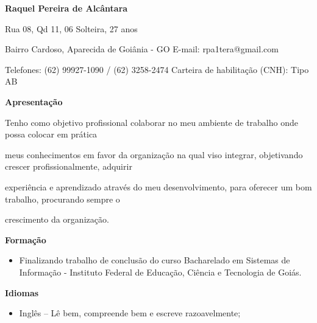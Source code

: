 \documentclass[a4paper,10pt]{report}
\newcommand{\nome}{Raquel Pereira de Alcântara}
\begin{document}
\pagestyle{empty}

\begin{center}
\begin{LARGE} 
 \textbf{\nome}
\end{LARGE}

\vspace{4em}
\begin{footnotesize}
Rua 08, Qd 11, 06 \hfill Solteira, 27 anos%

Bairro Cardoso, Aparecida de Goiânia - GO \hfill E-mail: rpa1tera@gmail.com%


Telefones: (62) 99927-1090 / (62) 3258-2474 \hfill Carteira de habilitação (CNH): Tipo AB%
\end{footnotesize}

\vspace{-.7em}
\hrulefill

\end{center}

\vspace{1em}
\textbf{\large{Apresentação}}
\newline

Tenho como objetivo profissional colaborar no meu ambiente de trabalho onde possa colocar em prática 

meus conhecimentos em favor da organização na qual viso integrar, objetivando crescer profissionalmente, adquirir 

experiência e aprendizado através do meu desenvolvimento, para oferecer um bom trabalho, procurando sempre o 

crescimento da organização.

\vspace{1em}
\textbf{\large{Formação}}

\begin{itemize}
\addtolength{\baselineskip}{-1\baselineskip}

 \item Finalizando trabalho de conclusão do curso Bacharelado em Sistemas de Informação - Instituto Federal de Educação, Ciência e Tecnologia de Goiás.

\end{itemize}

\vspace{1em}
\textbf{\large{Idiomas}}

\begin{itemize}
\addtolength{\baselineskip}{-1\baselineskip}
\item Inglês -- Lê bem, compreende bem e escreve razoavelmente;

\end{itemize}
\end{document}
